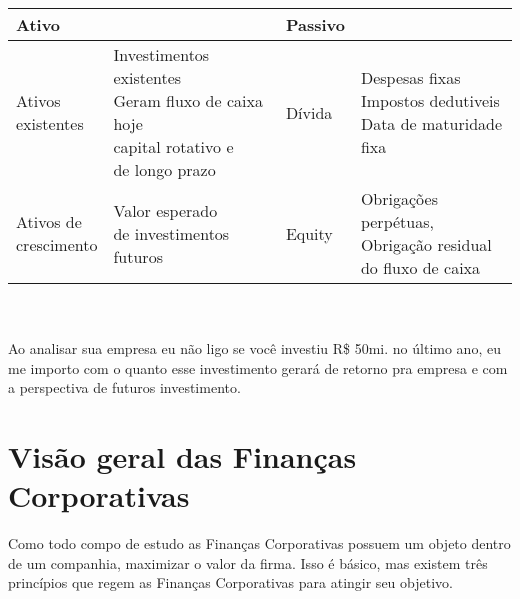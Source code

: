 \begin{tabular}{| l l | l l |}
\hline 
Ativo & & Passivo & \\ \hline

\makecell{Ativos \\ existentes } &
\makecell{Investimentos existentes \\ Geram fluxo de caixa hoje\\ capital rotativo e \\ de longo prazo}
& Dívida & \makecell{Despesas fixas \\ Impostos dedutiveis \\ Data de maturidade fixa} \\
\hline
\makecell{Ativos de \\ crescimento} &
\makecell{Valor esperado \\ de investimentos futuros} &
Equity & \makecell{Obrigações perpétuas, \\ Obrigação residual \\ do fluxo de caixa} \\
\hline
\end{tabular}
\\~\\
Ao analisar sua empresa eu não ligo se você investiu R\$ 50mi. no último ano, eu me importo com o quanto esse investimento gerará de retorno pra empresa e com a perspectiva de futuros investimento.

\section{Visão geral das Finanças Corporativas}
Como todo compo de estudo as Finanças Corporativas possuem um objeto dentro de um companhia, maximizar o valor da firma. Isso é básico, mas existem três princípios que regem as Finanças Corporativas para atingir seu objetivo.
